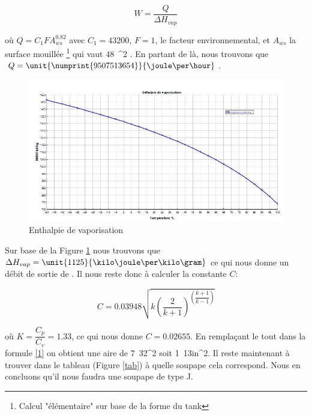 $$W=\dfrac{Q}{\Delta H_{vap}}$$

où $Q=C_1FA_{ws}^{0.82}$ avec $C_1=43200$, $F=1$, le facteur environnemental, et $A_ {ws}$ la surface mouillée \footnote{Calcul "élémentaire" sur base de la forme du tank} qui vaut \unit{48\pi}{\meter ^2} . En partant de là, nous trouvons que $Q=\unit{\numprint{9507513654}}{\joule \per \hour}$.

\begin{figure}[ht!]
\centering
\includegraphics[scale=0.4]{tache51.jpg}
\caption{Enthalpie de vaporisation}
\label{graph2}
\end{figure}

Sur base de la Figure \ref{graph2} nous trouvons que $\Delta H_{vap}=\unit{1125}{\kilo \joule \per \kilo \gram}$ ce qui nous donne un débit de sortie de \unit{}{\kilo \gram \per \hour}.
Il nous reste donc à calculer la constante $C$:

$$C=0.03948\sqrt{k\left( \dfrac{2}{k+1}\right)^{\left( \dfrac{k+1}{k-1}\right)}}$$

où $K=\dfrac{C_p}{C_v}=1.33$, ce qui nous donne $C=0.02655$. En remplaçant le tout dans la formule \ref{1} on obtient une aire de \unit{7.32}{\centi \metre^2} soit \unit{1.13}{in^2}. Il reste maintenant à trouver dans le tableau (Figure \ref{tab}) à quelle soupape cela correspond. Nous en concluons qu'il nous faudra une soupape de type J.

